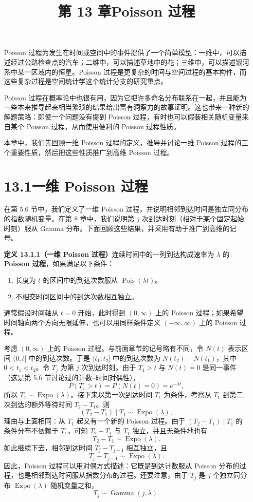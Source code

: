 \documentclass[UTF8, 12pt, fontset=fandol, oneside]{ctexart}
\title{第 13 章\quad Poisson 过程}
\author{}
\date{}
\begin{document}
\maketitle

Poisson 过程为发生在时间或空间中的事件提供了一个简单模型：一维中，可以描述经过公路检查点的汽车；二维中，可以描述草地中的花；三维中，可以描述银河系中某一区域内的恒星。Poisson 过程是更复杂的时间与空间过程的基本构件，而这些复杂过程是空间统计学这个统计分支的研究重点。

Poisson 过程在概率论中也很有用，因为它把许多命名分布联系在一起，并且能为一些本来推导起来相当繁琐的结果给出富有洞察力的故事证明。这也带来一种新的解题策略：即使一个问题没有提到 Poisson 过程，有时也可以假装相关随机变量来自某个 Poisson 过程，从而使用便利的 Poisson 过程性质。

本章中，我们先回顾一维 Poisson 过程的定义，推导并讨论一维 Poisson 过程的三个重要性质，然后把这些性质推广到高维 Poisson 过程。

\section*{13.1\quad 一维 Poisson 过程}

在第 5.6 节中，我们定义了一维 Poisson 过程，并说明相邻到达时间是独立同分布的指数随机变量。在第 8 章中，我们说明第 $j$ 次到达时刻（相对于某个固定起始时刻）服从 Gamma 分布。下面回顾这些结果，并采用有助于推广到高维的记号。

\noindent\textbf{定义 13.1.1（一维 Poisson 过程）}\quad 连续时间中的一列到达构成速率为 $\lambda$ 的 \textbf{Poisson 过程}，如果满足以下条件：
\begin{enumerate}
  \item 长度为 $t$ 的区间中的到达次数服从 $\operatorname{Pois}(\lambda t)$。
  \item 不相交时间区间中的到达次数相互独立。
\end{enumerate}

通常假设时间轴从 $t=0$ 开始，此时得到 $(0,\infty)$ 上的 Poisson 过程；如果希望时间轴向两个方向无限延伸，也可以用同样条件定义 $(-\infty,\infty)$ 上的 Poisson 过程。

考虑 $(0,\infty)$ 上的 Poisson 过程。与前面章节的记号略有不同，令 $N(t)$ 表示区间 $(0,t]$ 中的到达次数。于是 $(t_1,t_2]$ 中的到达次数为 $N(t_2)-N(t_1)$，其中 $0<t_1<t_2$。令 $T_j$ 为第 $j$ 次到达时刻。由于 $T_1>t$ 与 $N(t)=0$ 是同一事件（这是第 5.6 节讨论过的计数--时间对偶性），
\[
  P(T_1>t)=P(N(t)=0)=e^{-\lambda t},
\]
所以 $T_1\sim\operatorname{Expo}(\lambda)$。接下来以第一次到达时间 $T_1$ 为条件，考察从 $T_1$ 到第二次到达的额外等待时间 $T_2-T_1$。则
\[
  (T_2-T_1)\mid T_1 \sim \operatorname{Expo}(\lambda),
\]
理由与上面相同：从 $T_1$ 起又有一个新的 Poisson 过程。由于 $(T_2-T_1)\mid T_1$ 的条件分布不依赖于 $T_1$，可知 $T_2-T_1$ 与 $T_1$ 独立，并且无条件地也有
\[
  T_2-T_1\sim\operatorname{Expo}(\lambda).
\]
如此继续下去，相邻到达时间 $T_j-T_{j-1}$ 相互独立，且
\[
  T_j-T_{j-1}\sim\operatorname{Expo}(\lambda).
\]
因此，Poisson 过程可以用对偶方式描述：它既是到达计数服从 Poisson 分布的过程，也是相邻到达时间服从指数分布的过程。还要注意，由于 $T_j$ 是 $j$ 个独立同分布 $\operatorname{Expo}(\lambda)$ 随机变量之和，
\[
  T_j\sim\operatorname{Gamma}(j,\lambda).
\]
\end{document}

